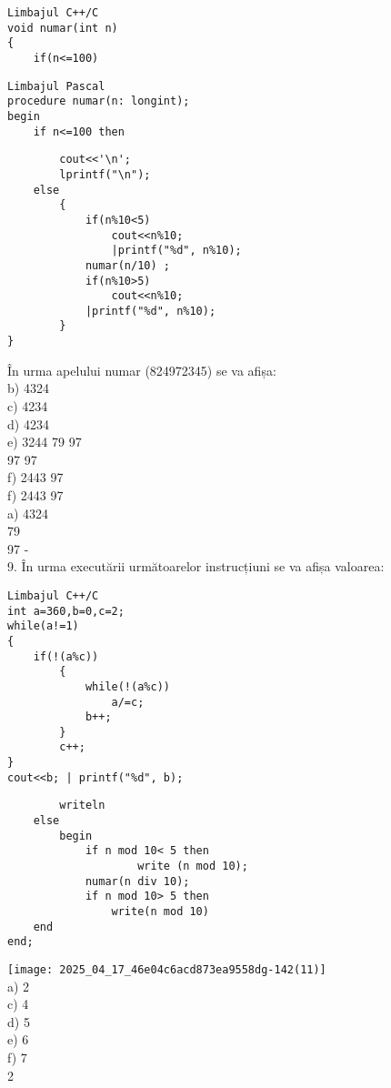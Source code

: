 \begin{verbatim}
Limbajul C++/C
void numar(int n)
{
    if(n<=100)
\end{verbatim}

\begin{verbatim}
Limbajul Pascal
procedure numar(n: longint);
begin
    if n<=100 then
\end{verbatim}

\begin{verbatim}
        cout<<'\n';
        lprintf("\n");
    else
        {
            if(n%10<5)
                cout<<n%10;
                |printf("%d", n%10);
            numar(n/10) ;
            if(n%10>5)
                cout<<n%10;
            |printf("%d", n%10);
        }
}
\end{verbatim}

În urma apelului numar (824972345) se va afișa:\\
b) 4324\\
c) 4234\\
d) 4234\\
e) 3244 79 97\\
97 97\\
f) 2443 97\\
f) 2443 97\\
a) 4324\\
79\\
97 -\\
9. În urma executării următoarelor instrucțiuni se va afișa valoarea:

\begin{verbatim}
Limbajul C++/C
int a=360,b=0,c=2;
while(a!=1)
{
    if(!(a%c))
        {
            while(!(a%c))
                a/=c;
            b++;
        }
        c++;
}
cout<<b; | printf("%d", b);
\end{verbatim}

\begin{verbatim}
        writeln
    else
        begin
            if n mod 10< 5 then
                    write (n mod 10);
            numar(n div 10);
            if n mod 10> 5 then
                write(n mod 10)
    end
end;
\end{verbatim}

\texttt{[image: 2025\_04\_17\_46e04c6acd873ea9558dg-142(11)]}\\
a) 2\\
c) 4\\
d) 5\\
e) 6\\
f) 7\\
2

